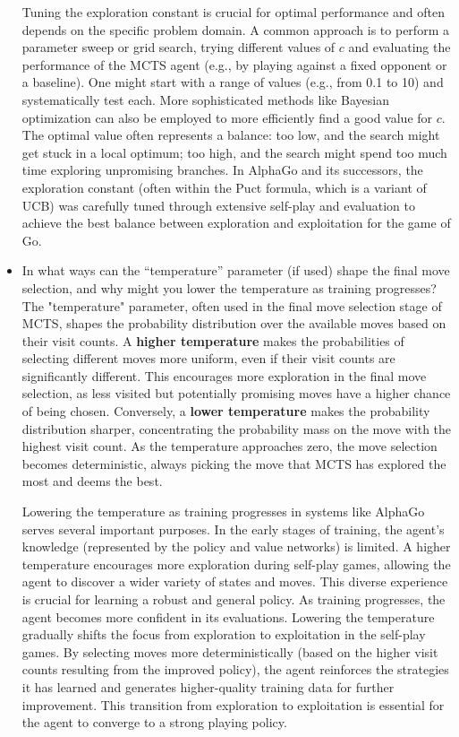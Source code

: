 \begin{itemize}
Tuning the exploration constant is crucial for optimal performance and often depends on the specific problem domain. A common approach is to perform a parameter sweep or grid search, trying different values of \( c \) and evaluating the performance of the MCTS agent (e.g., by playing against a fixed opponent or a baseline). One might start with a range of values (e.g., from 0.1 to 10) and systematically test each. More sophisticated methods like Bayesian optimization can also be employed to more efficiently find a good value for \( c \). The optimal value often represents a balance: too low, and the search might get stuck in a local optimum; too high, and the search might spend too much time exploring unpromising branches. In AlphaGo and its successors, the exploration constant (often within the Puct formula, which is a variant of UCB) was carefully tuned through extensive self-play and evaluation to achieve the best balance between exploration and exploitation for the game of Go.
    \item In what ways can the “temperature” parameter (if used) shape the final move selection, and why might you lower the temperature as training progresses?\\
    The "temperature" parameter, often used in the final move selection stage of MCTS, shapes the probability distribution over the available moves based on their visit counts. A \textbf{higher temperature} makes the probabilities of selecting different moves more uniform, even if their visit counts are significantly different. This encourages more exploration in the final move selection, as less visited but potentially promising moves have a higher chance of being chosen. Conversely, a \textbf{lower temperature} makes the probability distribution sharper, concentrating the probability mass on the move with the highest visit count. As the temperature approaches zero, the move selection becomes deterministic, always picking the move that MCTS has explored the most and deems the best.

Lowering the temperature as training progresses in systems like AlphaGo serves several important purposes. In the early stages of training, the agent's knowledge (represented by the policy and value networks) is limited. A higher temperature encourages more exploration during self-play games, allowing the agent to discover a wider variety of states and moves. This diverse experience is crucial for learning a robust and general policy. As training progresses, the agent becomes more confident in its evaluations. Lowering the temperature gradually shifts the focus from exploration to exploitation in the self-play games. By selecting moves more deterministically (based on the higher visit counts resulting from the improved policy), the agent reinforces the strategies it has learned and generates higher-quality training data for further improvement. This transition from exploration to exploitation is essential for the agent to converge to a strong playing policy.
\end{itemize}


